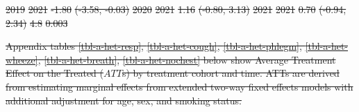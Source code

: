 \documentclass[
  letterpaper,
  DIV=11,
  numbers=noendperiod]{scrartcl}
\providecommand{\DIFdeltex}[1]{{\protect\color{red}\sout{#1}}}                      %
\providecommand{\DIFdelFL}[1]{\DIFdel{#1}} %
\providecommand{\DIFdel}[1]{\texorpdfstring{\DIFdeltex{#1}}{}} %
\begin{document}
\DIFdelFL{\hspace{1em}2019 }%
\DIFdelFL{2021 }%
\DIFdelFL{-1.80 }%
\DIFdelFL{(-3.58, -0.03) }%
\DIFdelFL{\hspace{1em}2020 }%
\DIFdelFL{2021 }%
\DIFdelFL{1.16 }%
\DIFdelFL{(-0.80, 3.13) }%
\DIFdelFL{\hspace{1em}2021 }%
\DIFdelFL{2021 }%
\DIFdelFL{0.70 }%
\DIFdelFL{(-0.94, 2.34) }%
\DIFdelFL{4.8 }%
\DIFdelFL{0.003}%



\DIFdel{Appendix tables \ref{tbl-a-het-resp}, \ref{tbl-a-het-cough},
\ref{tbl-a-het-phlegm}, \ref{tbl-a-het-wheeze}, \ref{tbl-a-het-breath},
\ref{tbl-a-het-nochest} below show Average Treatment Effect on the
Treated (\(ATT\)s) by treatment cohort and time. ATTs are derived from
estimating marginal effects from extended two-way fixed effects models
with additional adjustment for age, sex, and smoking status.
}%
\end{document}
